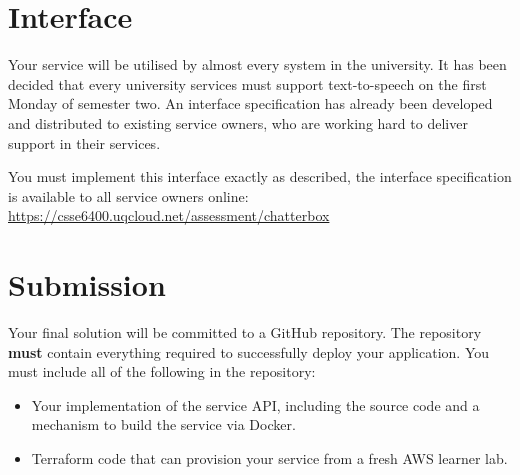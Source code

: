 \documentclass{csse4400}
\begin{document}


\section{Interface}
Your service will be utilised by almost every system in the university.
It has been decided that every university services must support text-to-speech on the first Monday of semester two.
An interface specification has already been developed and distributed to existing service owners,
who are working hard to deliver support in their services.

You must implement this interface exactly as described,
the interface specification is available to all service owners online:
\url{https://csse6400.uqcloud.net/assessment/chatterbox}

\section{Submission}
Your final solution will be committed to a GitHub repository.
The repository \textbf{must} contain everything required to successfully deploy your application.
You must include all of the following in the repository:
\begin{itemize}
  \item Your implementation of the service API, including the source code and a mechanism to build the service via Docker.
  \item Terraform code that can provision your service from a fresh AWS learner lab.
\end{itemize}

\end{document}
